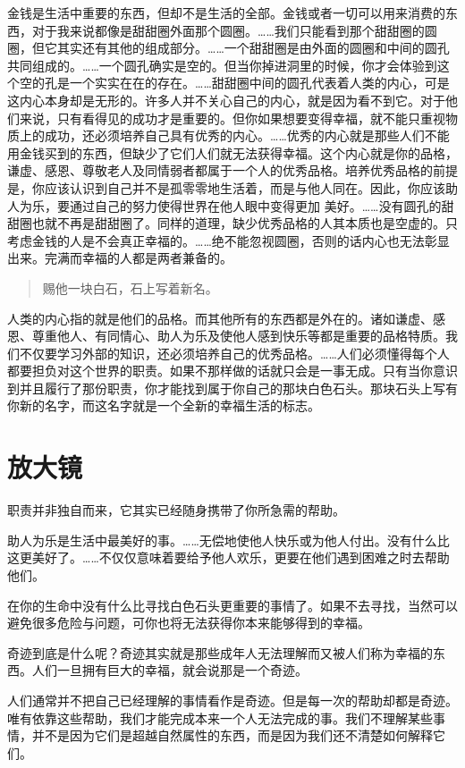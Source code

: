 \documentclass{ctexart}
\begin{document}
金钱是生活中重要的东西，但却不是生活的全部。金钱或者一切可以用来消费的东西，对于我来说都像是甜甜圈外面那个圆圈。……我们只能看到那个甜甜圈的圆圈，但它其实还有其他的组成部分。……一个甜甜圈是由外面的圆圈和中间的圆孔共同组成的。……一个圆孔确实是空的。但当你掉进洞里的时候，你才会体验到这个空的孔是一个实实在在的存在。……甜甜圈中间的圆孔代表着人类的内心，可是这内心本身却是无形的。许多人并不关心自己的内心，就是因为看不到它。对于他们来说，只有看得见的成功才是重要的。但你如果想要变得幸福，就不能只重视物质上的成功，还必须培养自己具有优秀的内心。……优秀的内心就是那些人们不能用金钱买到的东西，但缺少了它们人们就无法获得幸福。这个内心就是你的品格，谦虚、感恩、尊敬老人及同情弱者都属于一个人的优秀品格。培养优秀品格的前提是，你应该认识到自己并不是孤零零地生活着，而是与他人同在。因此，你应该助人为乐，要通过自己的努力使得世界在他人眼中变得更加
美好。……没有圆孔的甜甜圈也就不再是甜甜圈了。同样的道理，缺少优秀品格的人其本质也是空虚的。只考虑金钱的人是不会真正幸福的。……绝不能忽视圆圈，否则的话内心也无法彰显出来。完满而幸福的人都是两者兼备的。

\begin{quote}
    赐他一块白石，石上写着新名。
\end{quote}

人类的内心指的就是他们的品格。而其他所有的东西都是外在的。诸如谦虚、感恩、尊重他人、有同情心、助人为乐及使他人感到快乐等都是重要的品格特质。我们不仅要学习外部的知识，还必须培养自己的优秀品格。……人们必须懂得每个人都要担负对这个世界的职责。如果不那样做的话就只会是一事无成。只有当你意识到并且履行了那份职责，你才能找到属于你自己的那块白色石头。那块石头上写有你新的名字，而这名字就是一个全新的幸福生活的标志。

\section{放大镜}

职责并非独自而来，它其实已经随身携带了你所急需的帮助。

助人为乐是生活中最美好的事。……无偿地使他人快乐或为他人付出。没有什么比这更美好了。……不仅仅意味着要给予他人欢乐，更要在他们遇到困难之时去帮助他们。

在你的生命中没有什么比寻找白色石头更重要的事情了。如果不去寻找，当然可以避免很多危险与问题，可你也将无法获得你本来能够得到的幸福。

奇迹到底是什么呢？奇迹其实就是那些成年人无法理解而又被人们称为幸福的东西。人们一旦拥有巨大的幸福，就会说那是一个奇迹。

人们通常并不把自己已经理解的事情看作是奇迹。但是每一次的帮助却都是奇迹。唯有依靠这些帮助，我们才能完成本来一个人无法完成的事。我们不理解某些事情，并不是因为它们是超越自然属性的东西，而是因为我们还不清楚如何解释它们。
\end{document}
